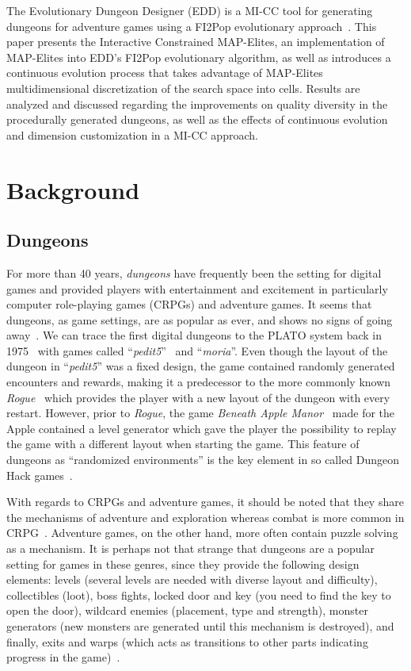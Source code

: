 \documentclass[conference]{IEEEtran}
\begin{document}
The Evolutionary Dungeon Designer (EDD) is a MI-CC tool for generating dungeons for adventure games using a FI2Pop evolutionary approach~\cite{Alvarez2018, Alvarez2018a, Baldwin2017, Baldwin2017a}. This paper presents the Interactive Constrained MAP-Elites, an implementation of MAP-Elites into EDD's FI2Pop evolutionary algorithm, as well as introduces a continuous evolution process that takes advantage of MAP-Elites multidimensional discretization of the search space into cells. Results are analyzed and discussed regarding the improvements on quality diversity in the procedurally generated dungeons, as well as the effects of continuous evolution and dimension customization in a MI-CC approach.

\section{Background}
\subsection{Dungeons}
For more than 40 years, \emph{dungeons} have frequently been the setting for digital games and provided players with entertainment and excitement in particularly computer role-playing games (CRPGs) and adventure games. It seems that dungeons, as game settings, are as popular as ever, and shows no signs of going away~\cite{totten2017}. We can trace the first digital dungeons to the PLATO system back in 1975~\cite{barton08dad,brewer2016b} with games called ``\emph{pedit5}''~\cite{pedit5} and ``\emph{moria}''. Even though the layout of the dungeon in ``\emph{pedit5}'' was a fixed design, the game contained randomly generated encounters and rewards, making it a predecessor to the more commonly known \emph{Rogue}~\cite{michael_toy_1980} which provides the player with a new layout of the dungeon with every restart. However, prior to \emph{Rogue}, the game \emph{Beneath Apple Manor}~\cite{applemanor} made for the Apple contained a level generator which gave the player the possibility to replay the game with a different layout when starting the game. This feature of dungeons as ``randomized environments'' is the key element in so called Dungeon Hack games~\cite{batemanboon}. 

With regards to CRPGs and adventure games, it should be noted that they share the mechanisms of adventure and exploration whereas combat is more common in CRPG~\cite{rollings-adams}. Adventure games, on the other hand, more often contain puzzle solving as a mechanism. It is perhaps not that strange that dungeons are a popular setting for games in these genres, since they provide the following design elements: levels (several levels are needed with diverse layout and difficulty), collectibles (loot), boss fights, locked door and key (you need to find the key to open the door), wildcard enemies (placement, type and strength), monster generators (new monsters are generated until this mechanism is destroyed), and finally, exits and warps (which acts as transitions to other parts indicating progress in the game)~\cite{rollings-adams}. 
\end{document}
